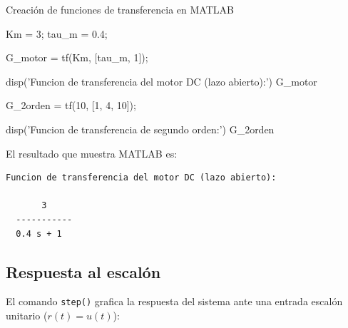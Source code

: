 \begin{matlabcodetitulo}{Creación de funciones de transferencia en MATLAB}


Km   = 3;      %
tau_m = 0.4;   %

G_motor = tf(Km, [tau_m, 1]);

disp('Funcion de transferencia del motor DC (lazo abierto):')
G_motor

G_2orden = tf(10, [1, 4, 10]);

disp('Funcion de transferencia de segundo orden:')
G_2orden
\end{matlabcodetitulo}

El resultado que muestra MATLAB es:
\begin{verbatim}
Funcion de transferencia del motor DC (lazo abierto):

       3
  -----------
  0.4 s + 1
\end{verbatim}

\subsection{Respuesta al escalón}

El comando \texttt{step()} grafica la respuesta del sistema ante una entrada
escalón unitario ($r(t) = u(t)$):

